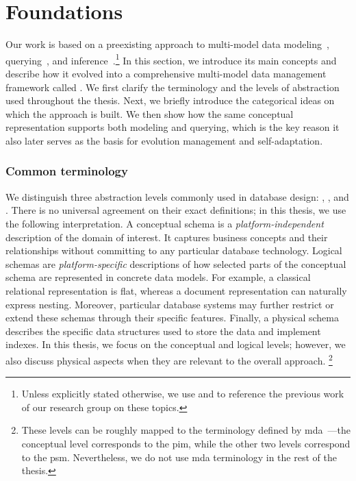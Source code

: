 \section{Foundations}
\label{sec:foundations}

Our work is based on a preexisting approach to multi-model data modeling~\citep{mm_cat, mm_cat_journal}, querying~\citep{mm_quecat, koupil2023universal}, and inference~\citep{mm_infer, koupil2022mminfer}.\footnote{Unless explicitly stated otherwise, we use  and  to reference the previous work of our research group on these topics.}
In this section, we introduce its main concepts and describe how it evolved into a comprehensive multi-model data management framework called . We first clarify the terminology and the levels of abstraction used throughout the thesis. Next, we briefly introduce the categorical ideas on which the approach is built. We then show how the same conceptual representation supports both modeling and querying, which is the key reason it also later serves as the basis for evolution management and self-adaptation.

\subsubsection{Common terminology}


We distinguish three abstraction levels commonly used in database design: , , and . There is no universal agreement on their exact definitions; in this thesis, we use the following interpretation. A conceptual schema is a \emph{platform-independent} description of the domain of interest. It captures business concepts and their relationships without committing to any particular database technology. Logical schemas are \emph{platform-specific} descriptions of how selected parts of the conceptual schema are represented in concrete data models. For example, a classical relational representation is flat, whereas a document representation can naturally express nesting. Moreover, particular database systems may further restrict or extend these schemas through their specific features. Finally, a physical schema describes the specific data structures used to store the data and implement indexes. In this thesis, we focus on the conceptual and logical levels; however, we also discuss physical aspects when they are relevant to the overall approach.%
\footnote{These levels can be roughly mapped to the terminology defined by \acrshort{mda}~\citep{MDA}---the conceptual level corresponds to the \acrshort{pim}, while the other two levels correspond to the \acrshort{psm}. Nevertheless, we do not use \acrshort{mda} terminology in the rest of the thesis.}

